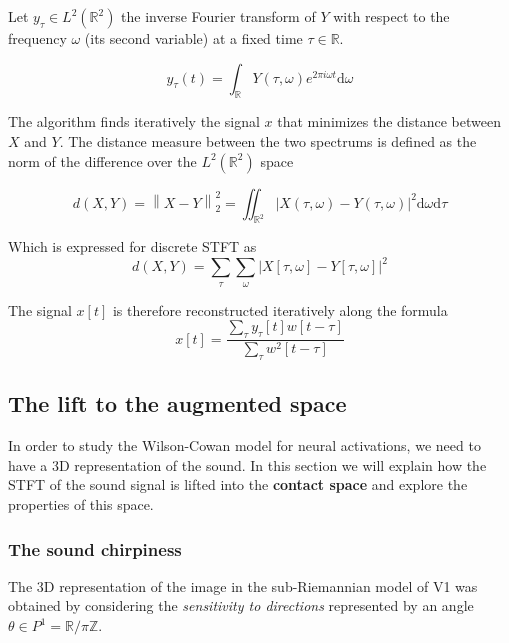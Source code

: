 \documentclass[american,]{article}
\theoremstyle{definition}
\theoremstyle{definition}
\theoremstyle{definition}
\theoremstyle{remark}
\begin{document}
Let \(y_\tau \in L^2(\mathbb{R}^2)\) the inverse Fourier transform of \(Y\)
with respect to the frequency \(\omega\) (its second variable)
at a fixed time \(\tau\in\mathbb{R}\).

\begin{equation}
y_\tau(t) = \int_{\mathbb{R}} Y(\tau,\omega) e^{2\pi i\omega t} \mathrm{d}\omega
\end{equation}

The algorithm finds iteratively the signal \(x\) that minimizes
the distance between \(X\) and \(Y\). The distance measure between
the two spectrums is defined as the norm of the difference
over the \(L^2(\mathbb{R}^2)\) space

\begin{equation}
d(X,Y) = \left\lVert X-Y\right\rVert_2^2
    = \iint_{\mathbb{R}^2} \left\lvert X(\tau,\omega) - Y(\tau,\omega)\right\rvert^2 \mathrm{d}\omega\mathrm{d}\tau
\end{equation}

Which is expressed for discrete STFT as
\begin{equation}
d(X,Y) = \sum_\tau \sum_\omega\left\lvert X[\tau,\omega] - Y[\tau,\omega]\right\rvert^2
\end{equation}

The signal \(x[t]\) is therefore reconstructed iteratively along the formula
\begin{equation}
x[t] = \frac{\sum\limits_\tau y_\tau[t]w[t-\tau]}{\sum\limits_\tau w^2[t-\tau]}
\end{equation}

\hypertarget{the-lift-to-the-augmented-space}{%
\subsection{The lift to the augmented space}\label{the-lift-to-the-augmented-space}}

In order to study the Wilson-Cowan model for neural activations,
we need to have a 3D representation of the sound.
In this section we will explain how the STFT of the sound signal
is lifted into the \textbf{contact space} and explore the properties of this space.

\hypertarget{the-sound-chirpiness}{%
\subsubsection{The sound chirpiness}\label{the-sound-chirpiness}}

The 3D representation of the image in the sub-Riemannian model of V1
was obtained by considering the \emph{sensitivity to directions}
represented by an angle \(\theta\in P^1=\mathbb{R}/\pi\mathbb{Z}\).
\end{document}
